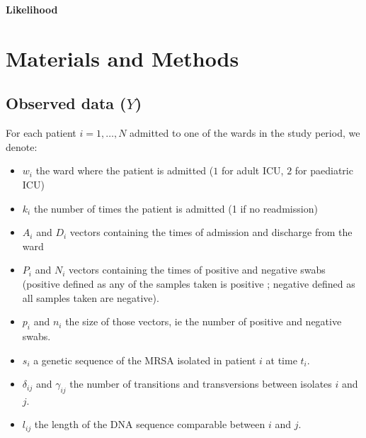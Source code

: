 \documentclass[10pt]{article}
\begin{document}
{\Large
\textbf{Likelihood}
}
\\
\section*{Materials and Methods}

\subsection*{Observed data ($Y$)}

For each patient $i=1,\ldots,N$ admitted to one of the wards in the study period, we denote:
\begin{itemize}
	\item $w_i$ the ward where the patient is admitted ($1$ for adult ICU, $2$ for paediatric ICU)
	\item $k_i$ the number of times the patient is admitted (1 if no readmission)
	\item $A_i$ and $D_i$ vectors containing the times of admission and discharge from the ward
	\item $P_i$ and $N_i$ vectors containing the times of positive and negative swabs (positive defined as any of the samples taken is positive ; negative defined as all samples taken are negative).
	\item $p_i$ and $n_i$ the size of those vectors, ie the number of positive and negative swabs.
	\item $s_i$ a genetic sequence of the MRSA isolated in patient $i$ at time $t_i$.
 	\item $\delta_{ij}$ and $\gamma_{ij}$ the number of transitions and transversions between isolates $i$ and $j$.
	\item $l_{ij}$ the length of the DNA sequence comparable between $i$ and $j$.

\end{itemize}
\end{document}
